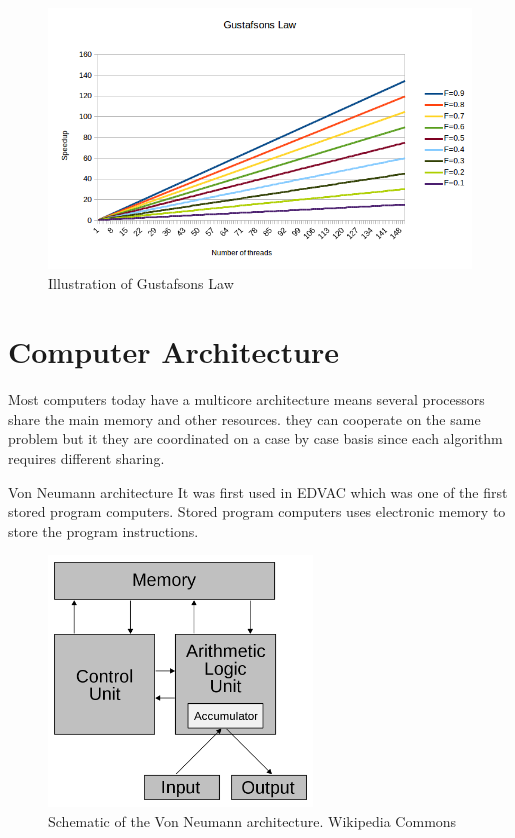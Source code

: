 \documentclass[10pt,a4paper]{article}
\begin{document}
\begin{figure}[h]
    \centering
    \includegraphics[width=13cm]{GustafsonsLaw.png}
    \caption{Illustration of Gustafsons Law}
    \label{fig:GustafsonsLaw}
\end{figure}

\clearpage
\section{Computer Architecture}
Most computers today have a multicore architecture
means several processors share the main memory and other resources. they can cooperate on the same problem but it they are coordinated on a case by case basis since each algorithm requires different sharing.

Von Neumann architecture
It was first used in EDVAC which was one of the first stored program computers\cite{von1993first}. Stored program computers uses electronic memory to store the program instructions\cite{computer_arch_2003}.

\begin{figure}[h]
    \centering
    \includegraphics[width=7cm]{Von_Neumann_architecture.png}
    \caption{Schematic of the Von Neumann architecture. Wikipedia Commons}
    \label{fig:VonNeumann}
\end{figure}
\end{document}
